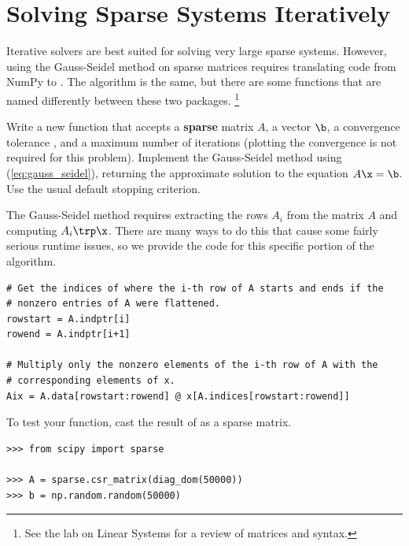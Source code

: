 \section*{Solving Sparse Systems Iteratively} %

Iterative solvers are best suited for solving very large sparse systems.
However, using the Gauss-Seidel method on sparse matrices requires translating code from NumPy to .
The algorithm is the same, but there are some functions that are named differently between these two packages.%
\footnote{See the lab on Linear Systems for a review of  matrices and syntax.}

\begin{problem} %
Write a new function that accepts a \textbf{sparse} matrix $A$, a vector $\b$, a convergence tolerance , and a maximum number of iterations  (plotting the convergence is not required for this problem).
Implement the Gauss-Seidel method using (\ref{eq:gauss_seidel}), returning the approximate solution to the equation $A\x = \b$.
Use the usual default stopping criterion.

The Gauss-Seidel method requires extracting the rows $A_i$ from the matrix $A$ and computing $A_i\trp\x$.
There are many ways to do this that cause some fairly serious runtime issues, so we provide the code for this specific portion of the algorithm.

\begin{lstlisting}
# Get the indices of where the i-th row of A starts and ends if the
# nonzero entries of A were flattened.
rowstart = A.indptr[i]
rowend = A.indptr[i+1]

# Multiply only the nonzero elements of the i-th row of A with the
# corresponding elements of x.
Aix = A.data[rowstart:rowend] @ x[A.indices[rowstart:rowend]]
\end{lstlisting}

To test your function, cast the result of  as a sparse matrix.

\begin{lstlisting}
>>> from scipy import sparse

>>> A = sparse.csr_matrix(diag_dom(50000))
>>> b = np.random.random(50000)
\end{lstlisting}
\end{problem}

